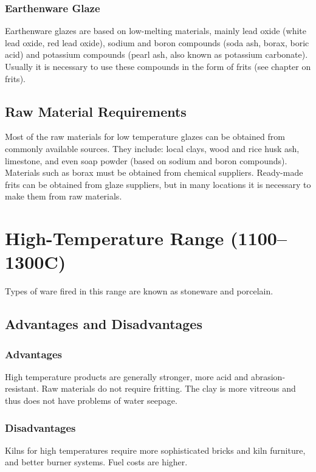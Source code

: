 \subsubsection{Earthenware Glaze}
Earthenware glazes are based on low-melting materials, mainly lead oxide (white 
lead oxide, red lead oxide), sodium and boron compounds (soda ash, borax, boric 
acid) and potassium compounds (pearl ash, also known as potassium carbonate). 
Usually it is necessary to use these compounds in the form of frits (see 
chapter on frits).
\subsection{Raw Material Requirements}
Most of the raw materials for low temperature glazes can be obtained from 
commonly available sources. They include: local clays, wood and rice husk ash, 
limestone, and even soap powder (based on sodium and boron compounds). 
Materials such as borax must be obtained from chemical suppliers. Ready-made 
frits can be obtained from glaze suppliers, but in many locations it is 
necessary to make them from raw materials.
\section{High-Temperature Range (1100--1300\degree C)}
Types of ware fired in this range are known as stoneware and porcelain.
\subsection{Advantages and Disadvantages}
\subsubsection{Advantages}
High temperature products are generally stronger, more  acid and 
abrasion-resistant. Raw materials do not require fritting. The clay is more 
vitreous and thus does not have problems of water seepage.
\subsubsection{Disadvantages}
Kilns for high temperatures require more sophisticated bricks and kiln 
furniture, and better burner systems. Fuel costs are higher.
